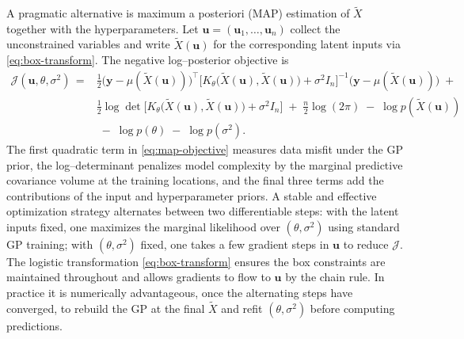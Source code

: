 \documentclass[journal]{new-aiaa}
\begin{document}
A pragmatic alternative is maximum a posteriori (MAP) estimation of $\tilde{X}$ together with the hyperparameters. Let $\mathbf{u}=(\mathbf{u}_1,\ldots,\mathbf{u}_n)$ collect the unconstrained variables and write $\tilde{X}(\mathbf{u})$ for the corresponding latent inputs via \eqref{eq:box-transform}. The negative log–posterior objective is
\begin{equation}
\label{eq:map-objective}
\begin{split}
\mathcal{J}(\mathbf{u},\theta,\sigma^2)
\,=& \frac{1}{2}\big(\mathbf{y}- \mu(\tilde{X}(\mathbf{u}))\big)^\top\!\!\Big[K_\theta\big(\tilde{X}(\mathbf{u}),\tilde{X}(\mathbf{u})\big)+\sigma^2 I_n\Big]^{-1}\!\big(\mathbf{y}-\mu(\tilde{X}(\mathbf{u}))\big)
\;+\; \\
&\frac{1}{2}\log\!\det\!\Big[K_\theta\big(\tilde{X}(\mathbf{u}),\tilde{X}(\mathbf{u})\big)+\sigma^2 I_n\Big]
\;+\; \frac{n}{2}\log(2\pi)
\;-\; \log p(\tilde{X}(\mathbf{u})) \\
& \;-\; \log p(\theta)
\;-\; \log p(\sigma^2).
\end{split}
\end{equation}
The first quadratic term in \eqref{eq:map-objective} measures data misfit under the GP prior, the log–determinant penalizes model complexity by the marginal predictive covariance volume at the training locations, and the final three terms add the contributions of the input and hyperparameter priors. A stable and effective optimization strategy alternates between two differentiable steps: with the latent inputs fixed, one maximizes the marginal likelihood over $(\theta,\sigma^2)$ using standard GP training; with $(\theta,\sigma^2)$ fixed, one takes a few gradient steps in $\mathbf{u}$ to reduce $\mathcal{J}$. The logistic transformation \eqref{eq:box-transform} ensures the box constraints are maintained throughout and allows gradients to flow to $\mathbf{u}$ by the chain rule. In practice it is numerically advantageous, once the alternating steps have converged, to rebuild the GP at the final $\tilde{X}$ and refit $(\theta,\sigma^2)$ before computing predictions.
\end{document}
